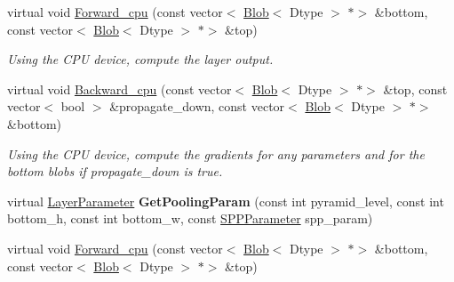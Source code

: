 \begin{DoxyCompactItemize}
\item 
\mbox{\label{classcaffe_1_1_s_p_p_layer_a8012e099ec860c310a3b9e64c365b872}} 
virtual void \mbox{\hyperlink{classcaffe_1_1_s_p_p_layer_a8012e099ec860c310a3b9e64c365b872}{Forward\+\_\+cpu}} (const vector$<$ \mbox{\hyperlink{classcaffe_1_1_blob}{Blob}}$<$ Dtype $>$ $\ast$$>$ \&bottom, const vector$<$ \mbox{\hyperlink{classcaffe_1_1_blob}{Blob}}$<$ Dtype $>$ $\ast$$>$ \&top)
\begin{DoxyCompactList}\small\item\em Using the C\+PU device, compute the layer output. \end{DoxyCompactList}\item 
\mbox{\label{classcaffe_1_1_s_p_p_layer_a0ad4bf01671eec91fc6fa9732f721555}} 
virtual void \mbox{\hyperlink{classcaffe_1_1_s_p_p_layer_a0ad4bf01671eec91fc6fa9732f721555}{Backward\+\_\+cpu}} (const vector$<$ \mbox{\hyperlink{classcaffe_1_1_blob}{Blob}}$<$ Dtype $>$ $\ast$$>$ \&top, const vector$<$ bool $>$ \&propagate\+\_\+down, const vector$<$ \mbox{\hyperlink{classcaffe_1_1_blob}{Blob}}$<$ Dtype $>$ $\ast$$>$ \&bottom)
\begin{DoxyCompactList}\small\item\em Using the C\+PU device, compute the gradients for any parameters and for the bottom blobs if propagate\+\_\+down is true. \end{DoxyCompactList}\item 
\mbox{\label{classcaffe_1_1_s_p_p_layer_ad3610c7dae250bac8f31c71dc3d6bb2d}} 
virtual \mbox{\hyperlink{classcaffe_1_1_layer_parameter}{Layer\+Parameter}} {\bfseries Get\+Pooling\+Param} (const int pyramid\+\_\+level, const int bottom\+\_\+h, const int bottom\+\_\+w, const \mbox{\hyperlink{classcaffe_1_1_s_p_p_parameter}{S\+P\+P\+Parameter}} spp\+\_\+param)
\item 
\mbox{\label{classcaffe_1_1_s_p_p_layer_a770160e9554fd611c4a8b648d90b58ca}} 
virtual void \mbox{\hyperlink{classcaffe_1_1_s_p_p_layer_a770160e9554fd611c4a8b648d90b58ca}{Forward\+\_\+cpu}} (const vector$<$ \mbox{\hyperlink{classcaffe_1_1_blob}{Blob}}$<$ Dtype $>$ $\ast$$>$ \&bottom, const vector$<$ \mbox{\hyperlink{classcaffe_1_1_blob}{Blob}}$<$ Dtype $>$ $\ast$$>$ \&top)

\end{DoxyCompactItemize}

